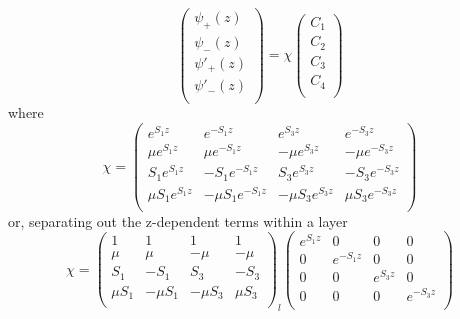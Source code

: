 \documentclass[%
 reprint,
 amsmath,
 amssymb,
 aps,
 prl,
 lengthcheck,%
]{revtex4-1}
\begin{document}
\begin{equation}
\label{eq:cd_to_pz}
  \begin{pmatrix}
    \psi_{+}(z) \\
    \psi_{-}(z) \\
    \psi'_{+}(z) \\
    \psi'_{-}(z) \\
  \end{pmatrix}
  = \chi
  \begin{pmatrix}
    C_1 \\
    C_2 \\
    C_3 \\
    C_4 \\
  \end{pmatrix}
\end{equation}
where 
\begin{equation}
  \chi = 
  \begin{pmatrix}
    e^{S_1 z} & e^{-S_1 z} & e^{S_3 z} & e^{-S_3 z} \\
    \mu e^{S_1 z} & \mu e^{-S_1 z} & -\mu e^{S_3 z} & -\mu e^{-S_3 z} \\
    S_1 e^{S_1 z} & -S_1 e^{-S_1 z} & S_3 e^{S_3 z} & -S_3e^{-S_3 z} \\
    \mu S_1 e^{S_1 z} & -\mu S_1 e^{-S_1 z} & -\mu S_3 e^{S_3 z} & \mu S_3 e^{-S_3 z} \\
  \end{pmatrix}
\end{equation}
or, separating out the z-dependent terms within a layer
\begin{equation}
  \chi = 
  \left(
  \begin{matrix}
    1 & 1 & 1 & 1 \\[0.3em]
    \mu & \mu & -\mu & -\mu \\[0.3em]
    S_1 & -S_1 & S_3 & -S_3 \\[0.3em]
    \mu S_1  & -\mu S_1 & -\mu S_3 & \mu S_3 \\[0.3em]
  \end{matrix}
  \right)_{\!\!\!\!l}
  \left(
  \begin{matrix}
    e^{S_1 z} & 0 & 0 & 0 \\[0.3em]
    0 & e^{-S_1 z} & 0 & 0 \\[0.3em]
    0 & 0 & e^{S_3 z} & 0 \\[0.3em]
    0 & 0 & 0 & e^{-S_3 z} \\[0.3em]
  \end{matrix}
  \right)
\end{equation}
\end{document}
